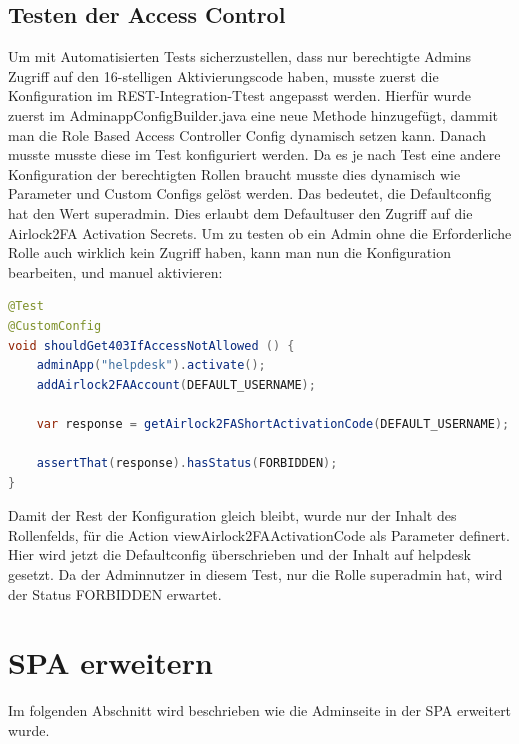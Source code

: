 \subsection{Testen der Access Control}\label{subsec:testacc}
Um mit Automatisierten Tests sicherzustellen, dass nur berechtigte Admins Zugriff auf den 16-stelligen Aktivierungscode haben, musste zuerst die Konfiguration im REST-Integration-Ttest angepasst werden. Hierfür wurde zuerst im AdminappConfigBuilder.java eine neue Methode hinzugefügt, dammit man die Role Based Access Controller Config dynamisch setzen kann. Danach musste musste diese im Test konfiguriert werden. Da es je nach Test eine andere Konfiguration der berechtigten Rollen braucht musste dies dynamisch wie Parameter und Custom Configs gelöst werden. Das bedeutet, die Defaultconfig hat den Wert \flqq superadmin\frqq{}. Dies erlaubt dem Defaultuser den Zugriff auf die Airlock2FA Activation Secrets. Um zu testen ob ein Admin ohne die Erforderliche Rolle auch wirklich kein Zugriff haben, kann man nun die Konfiguration bearbeiten, und manuel aktivieren:
\begin{lstlisting}[language=Java]
@Test
@CustomConfig
void shouldGet403IfAccessNotAllowed () {
	adminApp("helpdesk").activate();
	addAirlock2FAAccount(DEFAULT_USERNAME);
	
	var response = getAirlock2FAShortActivationCode(DEFAULT_USERNAME);
	
	assertThat(response).hasStatus(FORBIDDEN);
}
\end{lstlisting}
Damit der Rest der Konfiguration gleich bleibt, wurde nur der Inhalt des Rollenfelds, für die Action \flqq viewAirlock2FAActivationCode\frqq{} als Parameter definert. Hier wird jetzt die Defaultconfig überschrieben und der Inhalt auf helpdesk gesetzt. Da der Adminnutzer in diesem Test, nur die Rolle superadmin hat, wird der Status FORBIDDEN erwartet.
\section{SPA erweitern}
Im folgenden Abschnitt wird beschrieben wie die Adminseite in der SPA erweitert wurde.

